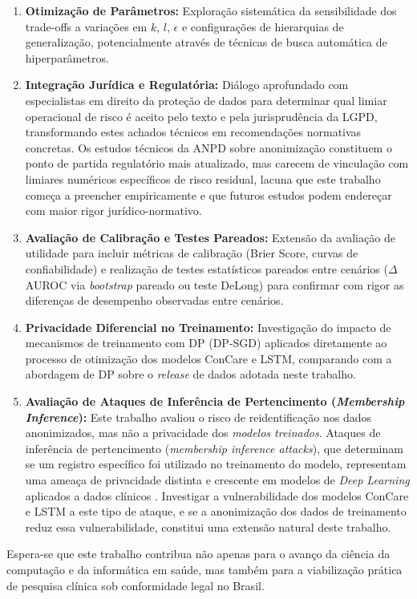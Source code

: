 \begin{enumerate}
    \item \textbf{Otimização de Parâmetros:} Exploração sistemática da sensibilidade dos trade-offs a variações em $k$, $l$, $\epsilon$ e configurações de hierarquias de generalização, potencialmente através de técnicas de busca automática de hiperparâmetros.
    
    \item \textbf{Integração Jurídica e Regulatória:} Diálogo aprofundado com especialistas em direito da proteção de dados para determinar qual limiar operacional de risco é aceito pelo texto e pela jurisprudência da LGPD, transformando estes achados técnicos em recomendações normativas concretas. Os estudos técnicos da ANPD sobre anonimização \cite{ANPD2023juridica, ANPD2023computacional} constituem o ponto de partida regulatório mais atualizado, mas carecem de vinculação com limiares numéricos específicos de risco residual, lacuna que este trabalho começa a preencher empiricamente e que futuros estudos podem endereçar com maior rigor jurídico-normativo.

    \item \textbf{Avaliação de Calibração e Testes Pareados:} Extensão da avaliação de utilidade para incluir métricas de calibração (Brier Score, curvas de confiabilidade) e realização de testes estatísticos pareados entre cenários ($\Delta$AUROC via \textit{bootstrap} pareado ou teste DeLong) para confirmar com rigor as diferenças de desempenho observadas entre cenários.

    \item \textbf{Privacidade Diferencial no Treinamento:} Investigação do impacto de mecanismos de treinamento com DP (DP-SGD) aplicados diretamente ao processo de otimização dos modelos ConCare e LSTM, comparando com a abordagem de DP sobre o \textit{release} de dados adotada neste trabalho.

    \item \textbf{Avaliação de Ataques de Inferência de Pertencimento (\textit{Membership Inference}):} Este trabalho avaliou o risco de reidentificação nos dados anonimizados, mas não a privacidade dos \textit{modelos treinados}. Ataques de inferência de pertencimento (\textit{membership inference attacks}), que determinam se um registro específico foi utilizado no treinamento do modelo, representam uma ameaça de privacidade distinta e crescente em modelos de \textit{Deep Learning} aplicados a dados clínicos \cite{Olatunji2024}. Investigar a vulnerabilidade dos modelos ConCare e LSTM a este tipo de ataque, e se a anonimização dos dados de treinamento reduz essa vulnerabilidade, constitui uma extensão natural deste trabalho.
\end{enumerate}

Espera-se que este trabalho contribua não apenas para o avanço da ciência da computação e da informática em saúde, mas também para a viabilização prática de pesquisa clínica sob conformidade legal no Brasil.